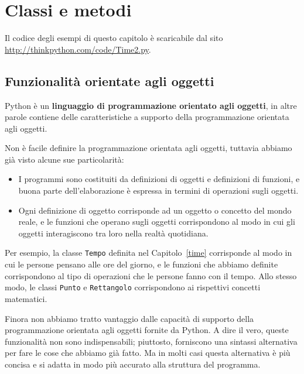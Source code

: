 \documentclass[10pt]{book}
\begin{document}
\chapter{Classi e metodi}

Il codice degli esempi di questo capitolo è scaricabile dal sito
\url{http://thinkpython.com/code/Time2.py}.

\section{Funzionalità orientate agli oggetti}

Python è un {\bf linguaggio di programmazione orientato agli oggetti}, in altre parole contiene delle caratteristiche a supporto della programmazione orientata agli oggetti.

Non è facile definire la programmazione orientata agli oggetti, tuttavia abbiamo già visto alcune sue particolarità:

\begin{itemize}

\item I programmi sono costituiti da definizioni di oggetti e definizioni di funzioni, e buona parte dell'elaborazione è espressa in termini di operazioni sugli oggetti.

\item Ogni definizione di oggetto corrisponde ad un oggetto o concetto del mondo reale, e le funzioni che operano sugli oggetti corrispondono al modo in cui gli oggetti interagiscono tra loro nella realtà quotidiana.

\end{itemize}

Per esempio, la classe {\tt Tempo} definita nel Capitolo~\ref{time}
corrisponde al modo in cui le persone pensano alle ore del giorno, e le funzioni che abbiamo definite corrispondono al tipo di operazioni che le persone fanno con il tempo. Allo stesso modo, le classi {\tt Punto} e {\tt Rettangolo} corrispondono ai rispettivi concetti matematici.

Finora non abbiamo tratto vantaggio dalle capacità di supporto della   programmazione orientata agli oggetti fornite da Python. A dire il vero, queste funzionalità non sono indispensabili; piuttosto, forniscono una sintassi alternativa per fare le cose che abbiamo già fatto. Ma in molti casi questa alternativa è più concisa e si adatta in modo più accurato alla struttura del programma.
\end{document}
